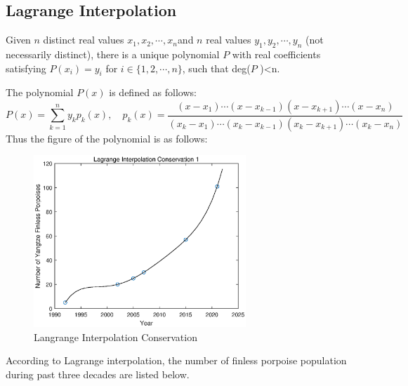 \documentclass{mcmthesis}
\numberwithin{figure}{section}
\numberwithin{table}{section}
\numberwithin{equation}{section}
\begin{document}
\subsection{Lagrange Interpolation}
Given $ n $ distinct real values $ x_1, x_2, \cdots , x_n $and $ n $
real values $ y_1, y_2,\cdots, y_n $ (not necessarily distinct), there
is a unique polynomial $ P $ with real coefficients satisfying 
$ P(x_i)= y_i $ for $ i \in \{1,2,\cdots,n\} $, such that deg($ P $ )<n.
\par
The polynomial $ P(x) $ is defined as follows:   
$$
  P(x) = \sum \limits _{k = 1}^ny_kp_k(x),\quad
  p_k(x) = \frac{(x-x_1)\cdots (x-x_{k-1})(x-x_{k+1})\cdots (x-x_n)}{
    (x_k-x_1)\cdots (x_k-x_{k-1})(x_k-x_{k+1})\cdots (x_k-x_n)
  }
$$
Thus the figure of the polynomial is as follows:
\begin{figure}[htbp!]
  \centering
  \includegraphics[width = 8cm]{codes/Lagrange.eps}
  \caption{Langrange Interpolation Conservation}
\end{figure}

\par
According to Lagrange interpolation, the number of finless porpoise population 
during past three decades are listed below.
\end{document}
